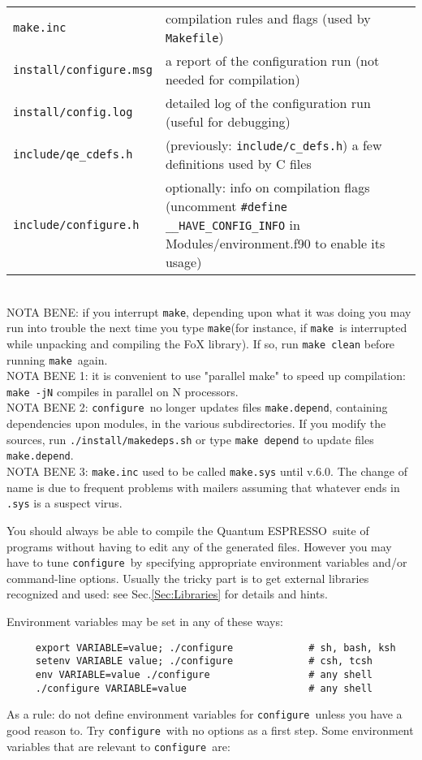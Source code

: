 \documentclass[12pt,a4paper]{article}
\def\qe{{\sc Quantum ESPRESSO}}
\def\configure{\texttt{configure}}
\def\make{\texttt{make}}
\begin{document}
\begin{tabular}{ll}
\texttt{make.inc} &      compilation rules and flags (used by \texttt{Makefile})\\
\texttt{install/configure.msg} & a report of the configuration run (not needed for compilation)\\
\texttt{install/config.log} & detailed log of the configuration run (useful for debugging)\\
	\texttt{include/qe\_cdefs.h} &  (previously: \texttt{include/c\_defs.h})
	a few definitions used by C files\\
\texttt{include/configure.h} &  optionally: info on compilation flags
	(uncomment \verb|#define __HAVE_CONFIG_INFO|
	 in Modules/environment.f90 to enable its usage)\\
\end{tabular}\\
NOTA BENE: if you interrupt \make, depending upon what it was doing
you may run into trouble the next time you type \make (for instance,
if \make\ is interrupted while unpacking and compiling the FoX library).
If so, run \texttt{make clean} before running \make\ again.\\
NOTA BENE 1: it is convenient to use "parallel make" to speed up compilation:
\texttt{make -jN} compiles in parallel on N processors.\\
NOTA BENE 2: \configure\ no longer updates files \texttt{make.depend},
containing dependencies upon modules, in the various subdirectories.
If you modify the sources, run \texttt{./install/makedeps.sh} or type
\texttt{make depend} to update files \texttt{make.depend}.\\
NOTA BENE 3: \texttt{make.inc} used to be called \texttt{make.sys}
until v.6.0. The change of name is due to frequent problems with mailers
assuming that whatever ends in \texttt{.sys} is a suspect virus.

You should always be able to compile the \qe\ suite
of programs without having to edit any of the generated files. However you
may have to tune \configure\ by specifying appropriate environment variables
and/or command-line options. Usually the tricky part is to get external
libraries recognized and used: see Sec.\ref{Sec:Libraries}
for details and hints.

Environment variables may be set in any of these ways:
\begin{verbatim}
     export VARIABLE=value; ./configure             # sh, bash, ksh
     setenv VARIABLE value; ./configure             # csh, tcsh
     env VARIABLE=value ./configure                 # any shell
     ./configure VARIABLE=value                     # any shell
\end{verbatim}
As a rule: do not define environment variables for \configure\ unless
you have a good reason to. Try \configure\ with no options as a first step.
Some environment variables that are relevant to \configure\ are:
\end{document}

